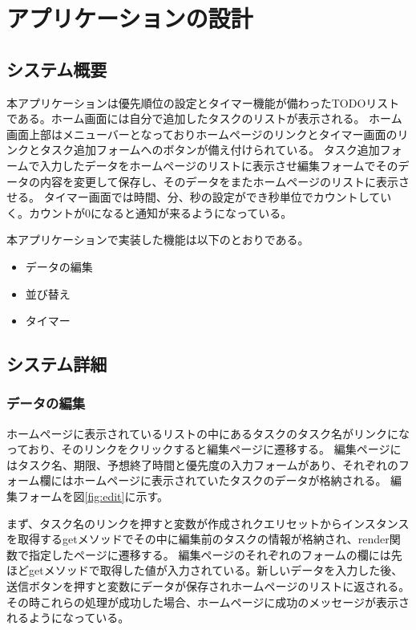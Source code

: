 \chapter{アプリケーションの設計}
\label{cha:function}

\section{システム概要}
本アプリケーションは優先順位の設定とタイマー機能が備わったTODOリストである。ホーム画面には自分で追加したタスクのリストが表示される。
ホーム画面上部はメニューバーとなっておりホームページのリンクとタイマー画面のリンクとタスク追加フォームへのボタンが備え付けられている。
タスク追加フォームで入力したデータをホームページのリストに表示させ編集フォームでそのデータの内容を変更して保存し、そのデータをまたホームページのリストに表示させる。
タイマー画面では時間、分、秒の設定ができ秒単位でカウントしていく。カウントが0になると通知が来るようになっている。

本アプリケーションで実装した機能は以下のとおりである。

\begin{itemize}
    \item データの編集
    \item 並び替え
    \item タイマー
\end{itemize}

\section{システム詳細}
\subsection{データの編集}
ホームページに表示されているリストの中にあるタスクのタスク名がリンクになっており、そのリンクをクリックすると編集ページに遷移する。
編集ページにはタスク名、期限、予想終了時間と優先度の入力フォームがあり、それぞれのフォーム欄にはホームページに表示されていたタスクのデータが格納される。
編集フォームを図\ref{fig:edit}に示す。

まず、タスク名のリンクを押すと変数が作成されクエリセットからインスタンスを取得するgetメソッドでその中に編集前のタスクの情報が格納され、render関数で指定したページに遷移する。
編集ページのそれぞれのフォームの欄には先ほどgetメソッドで取得した値が入力されている。新しいデータを入力した後、送信ボタンを押すと変数にデータが保存されホームページのリストに返される。
その時これらの処理が成功した場合、ホームページに成功のメッセージが表示されるようになっている。


